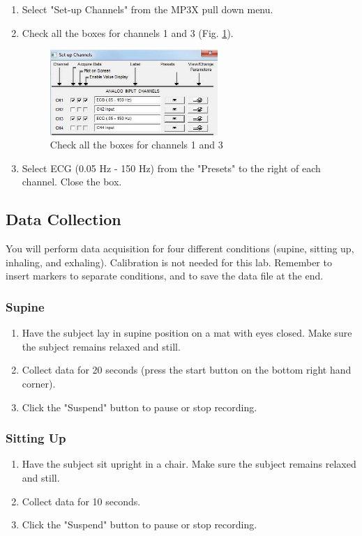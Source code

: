 \documentclass{article}
\begin{document}
\begin{enumerate}
	\item Select "Set-up Channels" from the MP3X pull down menu.
	\item Check all the boxes for channels 1 and 3 (Fig. \ref{boxes}).
		\begin{figure}[h]
	\centering\includegraphics[width=0.6\textwidth]{../images/ECG_II_6.jpg}
		\caption{Check all the boxes for channels 1 and 3}
		\label{boxes}
		\end{figure}
		
	\item Select ECG (0.05 Hz - 150 Hz) from the "Presets" to the right of each channel. Close the box.
\end{enumerate}

\subsection*{Data Collection}
You will perform data acquisition for four different conditions (supine, sitting up, inhaling, and exhaling). Calibration is not needed for this lab. Remember to insert markers to separate conditions, and to save the data file at the end.
\subsubsection*{Supine}
\begin{enumerate}
	\item Have the subject lay in supine position on a mat with eyes closed. Make sure the subject remains relaxed and still.
	\item Collect data for 20 seconds (press the start button on the bottom right hand corner).
	\item Click the "Suspend" button to pause or stop recording.
\end{enumerate}

\subsubsection*{Sitting Up}
\begin{enumerate}
	\item Have the subject sit upright in a chair. Make sure the subject remains relaxed and still.
	\item Collect data for 10 seconds.
	\item Click the "Suspend" button to pause or stop recording.
\end{enumerate}
\end{document}
